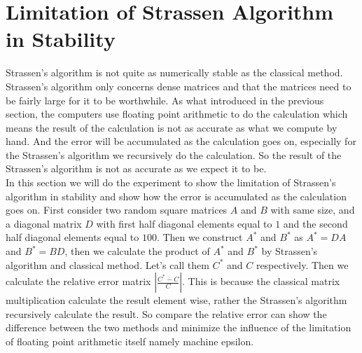 \documentclass{article}
\begin{document}
\section{Limitation of Strassen Algorithm in Stability}
\hspace{5.5mm}Strassen's algorithm is not quite as numerically stable as the classical method. Strassen's algorithm only concerns dense matrices and that the matrices need to be fairly large for it to be worthwhile. As what introduced 
in the previous section, the computers use floating point arithmetic to do the calculation which means the result of the calculation is not as accurate as what we compute by hand. And the error will be accumulated as the calculation 
goes on, especially for the Strassen's algorithm we recursively do the calculation. So the result of the Strassen's algorithm is not as accurate as we expect it to be.\\

In this section we will do the experiment to show the limitation of Strassen's algorithm in stability and show how the error is accumulated as the calculation goes on. First consider two random square matrices $A$ and $B$ with same size, and 
a diagonal matrix $D$ with first half diagonal elements equal to $1$ and the second half diagonal elements equal to $100$. Then we construct $A^{*}$ and $B^{*}$ as $A^{*} = DA$ and $B^{*} = BD$, then we calculate the product of $A^{*}$ and $B^{*}$ 
by Strassen's algorithm and classical method. Let's call them $C^{*}$ and $C$ respectively. Then we calculate the relative error matrix $|\frac{C^{*} - C}{C}|$. This is because the classical matrix multiplication
calculate the result element wise, rather the Strassen's algorithm recursively calculate the result. So compare the relative error can show the difference between the two methods and minimize the influence of the limitation of floating point 
arithmetic itself namely machine epsilon.\\
\end{document}
